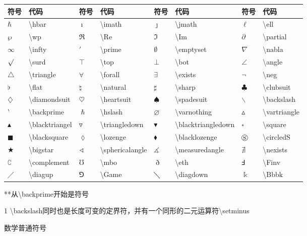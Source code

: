 \documentclass[UTF8,fontset=ubuntu]{ctexart}
\begin{document}
\begin{threeparttable}
\begin{tabular}{l l l l l l l l}
	\hline
	符号 & 代码 & 符号 & 代码 & 符号 & 代码 & 符号 & 代码\\
	\hline
	$\hbar$ & \textbackslash hbar & $\imath$ & \textbackslash imath & $\jmath$ & \textbackslash jmath & $\ell$ & \textbackslash ell\\
	$\wp$ & \textbackslash wp & $\Re$ & \textbackslash Re & $\Im$ & \textbackslash Im & $\partial$ & \textbackslash partial\\
	$\infty$ & \textbackslash infty & $\prime$ & \textbackslash prime & $\emptyset$ & \textbackslash emptyset & $\nabla$ & \textbackslash nabla\\
	$\surd$ & \textbackslash surd & $\top$ & \textbackslash top & $\bot$ & \textbackslash bot & $\angle$ & \textbackslash angle\\
	$\triangle$ & \textbackslash triangle & $\forall$ & \textbackslash forall & $\exists$ & \textbackslash exists & $\neg$ & \textbackslash neg\\
	$\flat$ & \textbackslash flat & $\natural$ & \textbackslash natural & $\sharp$ & \textbackslash sharp & $\clubsuit$ & \textbackslash clubsuit\\
	$\diamondsuit$ & \textbackslash diamondsuit & $\heartsuit$ & \textbackslash heartsuit & $\spadesuit$ & \textbackslash spadesuit & $\backslash$ & \textbackslash backslash\tnote{1}\\
	$\backprime$ & \textbackslash backprime & $\hslash$ & \textbackslash hslash & $\varnothing$ & \textbackslash varnothing & $\vartriangle$ & \textbackslash vartriangle\\
	$\blacktriangle$ & \textbackslash blacktriangel & $\triangledown$ & \textbackslash triangledown & $\blacktriangledown$ & \textbackslash blacktriangledown & $\square$ & \textbackslash square\\
	$\blacksquare$ & \textbackslash blacksquare & $\lozenge$ & \textbackslash lozenge & $\blacklozenge$ & \textbackslash blacklozenge & $\circledS$ & \textbackslash circledS\\
	$\bigstar$ & \textbackslash bigstar & $\sphericalangle$ & \textbackslash sphericalangle & $\measuredangle$ & \textbackslash measuredangle & $\nexists$ & \textbackslash nexists\\
	$\complement$ & \textbackslash complement & $\mho$ & \textbackslash mbo & $\eth$ & \textbackslash eth & $\Finv$ & \textbackslash Finv\\
	$\diagup$ & \textbackslash diagup & $\Game$ & \textbackslash Game & $\diagdown$ & \textbackslash diagdown & $\Bbbk$ & \textbackslash Bbbk\\
	\hline
\end{tabular}
**从\textbackslash backprime开始是\AMS 符号
\begin{tablenotes}
	\item[1] \textbackslash backslash同时也是长度可变的定界符，并有一个同形的二元运算符\textbackslash setminus
\end{tablenotes}
\caption{数学普通符号}
\end{threeparttable}
\end{document}
